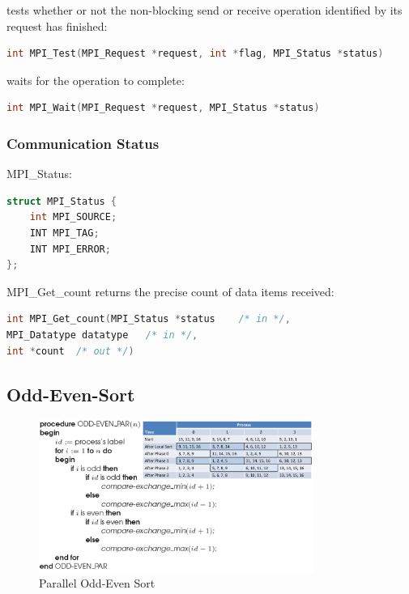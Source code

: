 tests whether or not the non-blocking send or receive operation
identified by its request has finished:

\begin{lstlisting}[language=C++]
int MPI_Test(MPI_Request *request, int *flag, MPI_Status *status)
\end{lstlisting}

waits for the operation to complete:

\begin{lstlisting}[language=C++]
int MPI_Wait(MPI_Request *request, MPI_Status *status)
\end{lstlisting}

\hypertarget{communication-status}{%
\subsubsection{Communication Status}\label{communication-status}}

MPI\_Status:

\begin{lstlisting}[language=C++]
struct MPI_Status {
    int MPI_SOURCE;
    INT MPI_TAG;
    INT MPI_ERROR;
};
\end{lstlisting}

MPI\_Get\_count returns the precise count of data items received:

\begin{lstlisting}[language=C++]
int MPI_Get_count(MPI_Status *status    /* in */,
MPI_Datatype datatype   /* in */,
int *count  /* out */)
\end{lstlisting}

\clearpage
\hypertarget{odd-even-sort}{%
\subsection{Odd-Even-Sort}\label{odd-even-sort}}

\begin{figure}[H]
\centering
\includegraphics[width=0.8\textwidth]{figures/oddevensortMPI.png}
\caption{Parallel Odd-Even Sort}
\end{figure}

